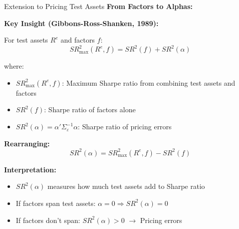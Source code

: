 \documentclass{beamer}
\begin{document}
\begin{frame}{Extension to Pricing Test Assets}
    \textbf{From Factors to Alphas:}
    
    \textbf{Key Insight (Gibbons-Ross-Shanken, 1989):}
    
    For test assets $R^e$ and factors $f$:
    \begin{equation}\label{eq:grs}
        SR^2_{\max}(R^e, f) = SR^2(f) + SR^2(\alpha)
    \end{equation}
    
    where:
    \begin{itemize}
        \item $SR^2_{\max}(R^e, f)$: Maximum Sharpe ratio from combining test assets and factors
        \item $SR^2(f)$: Sharpe ratio of factors alone
        \item $SR^2(\alpha) = \alpha' \Sigma_\varepsilon^{-1} \alpha$: Sharpe ratio of pricing errors
    \end{itemize}
    
    \vspace{0.3cm}
    \textbf{Rearranging:}
    \begin{equation}\label{eq:alpha_sr}
        SR^2(\alpha) = SR^2_{\max}(R^e, f) - SR^2(f)
    \end{equation}
    
    
    \textbf{Interpretation:}
    \begin{itemize}
        \item $SR^2(\alpha)$ measures how much test assets add to Sharpe ratio
        \item If factors span test assets: $\alpha = 0 \Rightarrow SR^2(\alpha) = 0$
        \item If factors don't span: $SR^2(\alpha) > 0$ $\rightarrow$ Pricing errors
    \end{itemize}
\end{frame}
\end{document}
